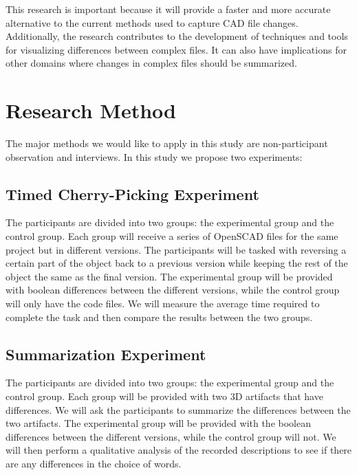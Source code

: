 \documentclass[sigconf,authorversion,nonacm]{acmart}
\begin{document}
This research is important because it will provide a faster and more accurate alternative to the current methods used to capture CAD file changes. Additionally, the research contributes to the development of techniques and tools for visualizing differences between complex files. It can also have implications for other domains where changes in complex files should be summarized.

\section{Research Method}

The major methods we would like to apply in this study are non-participant observation and interviews. In this study we propose two experiments:

\subsection{Timed Cherry-Picking Experiment}
The participants are divided into two groups: the experimental group and the control group. Each group will receive a series of OpenSCAD files for the same project but in different versions. The participants will be tasked with reversing a certain part of the object back to a previous version while keeping the rest of the object the same as the final version. The experimental group will be provided with boolean differences between the different versions, while the control group will only have the code files. We will measure the average time required to complete the task and then compare the results between the two groups.

\subsection{Summarization Experiment}
The participants are divided into two groups: the experimental group and the control group. Each group will be provided with two 3D artifacts that have differences. We will ask the participants to summarize the differences between the two artifacts. The experimental group will be provided with the boolean differences between the different versions, while the control group will not. We will then perform a qualitative analysis of the recorded descriptions to see if there are any differences in the choice of words.
\end{document}
